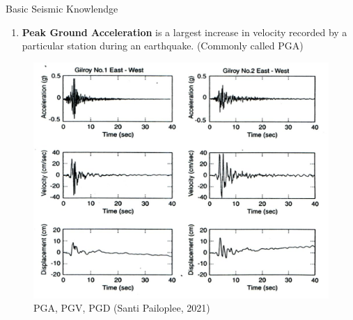 \documentclass{beamer}
\newcounter{saveenumi}
\newcommand{\seti}{\setcounter{saveenumi}{\value{enumi}}}
\newcommand{\conti}{\setcounter{enumi}{\value{saveenumi}}}
\begin{document}
		
	\begin{frame}[t]{Basic Seismic Knowlendge}
		\begin{enumerate}
			\conti
			\item \textbf{Peak Ground Acceleration} is a largest increase in velocity recorded by a particular station during 
			an earthquake. (Commonly called PGA) 
			\seti
		\end{enumerate}
		
		\begin{figure}
			\centering
			\includegraphics[scale=0.35]{pga.jpg}
			\caption{PGA, PGV, PGD (Santi Pailoplee, 2021)}
		\end{figure}
	\end{frame}
	
\end{document}
